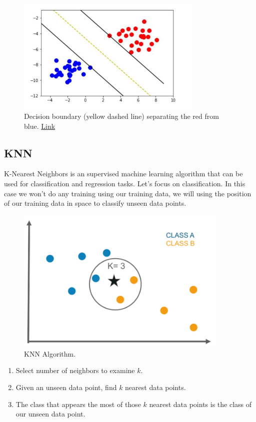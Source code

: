\documentclass{article}
\begin{document}
\begin{figure}[H]
    \centering
    \includegraphics[width=3.5in]{svm.jpeg}
    \caption{Decision boundary (yellow dashed line) separating the red from blue. \href{https://medium.com/deep-math-machine-learning-ai/chapter-3-support-vector-machine-with-math-47d6193c82be}{Link}}
\end{figure}

\newpage
\subsection{KNN} 
K-Nearest Neighbors is an supervised machine learning algorithm that can be used for classification and regression tasks. Let's focus on classification. In this case we won't do any training using our training data, we will using the position of our training data in space to classify unseen data points.

\begin{figure}[H]
    \centering
    \includegraphics[width=4.0in]{knn.png}
    \caption{KNN Algorithm.}
\end{figure}

\begin{enumerate}
    \item Select number of neighbors to examine $k$.
    \item Given an unseen data point, find $k$ nearest data points.
    \item The class that appears the most of those $k$ nearest data points is the class of our unseen data point.
\end{enumerate}
\end{document}
